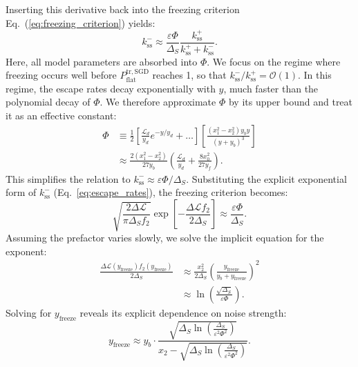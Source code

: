 \documentclass[aps,prx,reprint,superscriptaddress,longbibliography,nofootinbib,floatfix]{revtex4-2}
\begin{document}
Inserting this derivative back into the freezing criterion Eq.~(\ref{eq:freezing_criterion}) yields:
\begin{equation}
     k_\mathrm{ss}^{-} \approx \frac{\varepsilon \Phi}{\Delta_S} \frac{k_\mathrm{ss}^{+}}{k_\mathrm{ss}^{+} + k_\mathrm{ss}^{-}}.
\end{equation}
Here, all model parameters are absorbed into $\Phi$. We focus on the regime where freezing occurs well before 
$P_{\mathrm{flat}}^{\mathrm{tr,SGD}}$ reaches 1, so that 
$k_\mathrm{ss}^{-}/k_\mathrm{ss}^{+}=\mathcal{O}(1)$. 
In this regime, the escape rates decay exponentially with $y$, 
much faster than the polynomial decay of $\Phi$. 
We therefore approximate $\Phi$ by its upper bound and treat it as an effective constant:
\begin{equation}
\begin{split}
    \Phi &\equiv \frac{1}{2}\left[ \frac{\mathcal{L}_d}{y_d} e^{-y/y_d} +\dots \right] \left[ \frac{(x_1^2-x_2^2)y_b y}{(y+y_b)^3} \right] \\
    &\approx \frac{2(x_1^2-x_2^2)}{27 y_b}\left(\frac{\mathcal{L}_d}{y_d}+\frac{8x_0^2}{27 y_f}\right).
\end{split}
\end{equation}
This simplifies the relation to ${k_\mathrm{ss}^{-}} \approx \varepsilon \Phi / \Delta_S$. Substituting the explicit exponential form of $k_\mathrm{ss}^{-}$ (Eq.~\ref{eq:escape_rates}), the freezing criterion becomes:
\begin{equation}
    \sqrt{\frac{2 \Delta \mathcal{L}}{\pi \Delta_S f_2}} \exp\left[- \frac{\Delta \mathcal{L} f_2}{2\Delta_S} \right] \approx \frac{\varepsilon \Phi}{\Delta_S}.
\end{equation}
Assuming the prefactor varies slowly, we solve the implicit equation for the exponent:
\begin{equation}
\begin{split}
    \frac{\Delta \mathcal{L}(y_\mathrm{freeze}) f_2(y_\mathrm{freeze})}{2\Delta_S} 
    &\approx \frac{x_2^2}{2\Delta_S} \left(\frac{y_\mathrm{freeze}}{y_b+y_\mathrm{freeze}}\right)^2 \\
    &\approx \ln\left( \frac{\sqrt{\Delta_S}}{\varepsilon \Phi} \right).
\end{split}
\end{equation}
Solving for $y_\mathrm{freeze}$ reveals its explicit dependence on noise strength:
\begin{equation}
y_\mathrm{freeze} \approx y_b \cdot \frac{\sqrt{\Delta_S \ln\left( \frac{\Delta_S}{\varepsilon^2 \Phi^2} \right)}}{x_2 - \sqrt{\Delta_S \ln\left( \frac{\Delta_S}{\varepsilon^2 \Phi^2} \right)}}.
\label{eq:y_freeze_explicit}
\end{equation}
\end{document}
